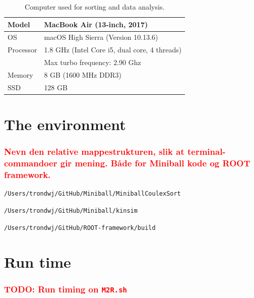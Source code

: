 \documentclass[twoside,english]{uiofysmaster/uiofysmaster}
\begin{document}
\begin{appendices}
\begin{table}[H] 
	\centering 
	\caption{Computer used for sorting and data analysis.}
	\label{tab:PC}
	\begin{tabular}{ll}
		\hline
		Model & MacBook Air (13-inch, 2017) \\
		\hline
		OS              & macOS High Sierra (Version 10.13.6) \\
		Processor  &  1.8 GHz (Intel Core i5, dual core, 4 threads)  \\
						 &  Max turbo frequency: 2.90 Ghz  \\
		Memory     &  8 GB (1600 MHz DDR3)  \\
		SSD		     &  128 GB  \\
		\hline
	\end{tabular}
\end{table}


\section{The environment}
\subsubsection*{\textcolor{red}{Nevn den relative mappestrukturen, slik at terminal-commandoer gir mening. Både for Miniball kode og ROOT framework.}}

\begin{lstlisting}[language=sh]
/Users/trondwj/GitHub/Miniball/MiniballCoulexSort
\end{lstlisting}

\begin{lstlisting}[language=sh]
/Users/trondwj/GitHub/Miniball/kinsim
\end{lstlisting}

\begin{lstlisting}[language=sh]
/Users/trondwj/GitHub/ROOT-framework/build
\end{lstlisting}


\section{Run time}

\subsubsection{\textcolor{red}{TODO: Run timing on \texttt{M2R.sh}}}


\end{appendices}
\end{document}

